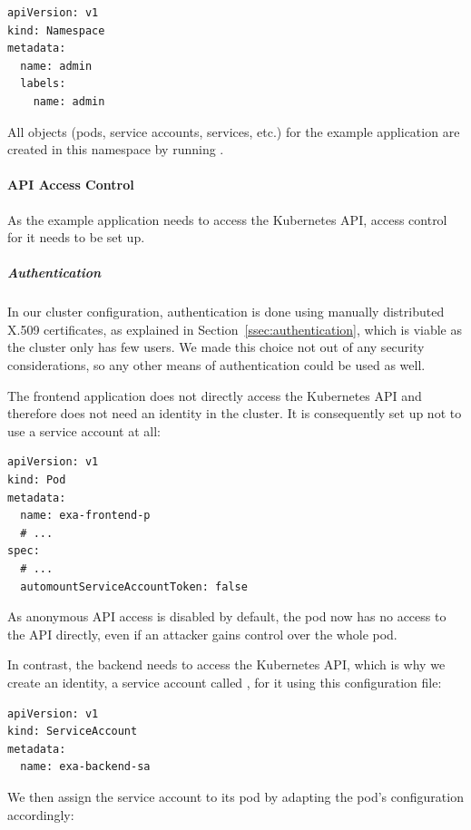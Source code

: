 \begin{verbatim}
apiVersion: v1
kind: Namespace
metadata:
  name: admin
  labels:
    name: admin
\end{verbatim}

All objects (pods, service accounts, services, etc.) for the example application are created in this namespace by running .

\paragraph{API Access Control}

As the example application needs to access the Kubernetes API, access control for it needs to be set up.

\subparagraph{Authentication}
In our cluster configuration, authentication is done using manually distributed X.509 certificates, as explained in Section~\ref{ssec:authentication}, which is viable as the cluster only has few users. We made this choice not out of any security considerations, so any other means of authentication could be used as well. 

The frontend application does not directly access the Kubernetes API and therefore does not need an identity in the cluster. It is consequently set up not to use a service account at all:

\begin{verbatim}
apiVersion: v1
kind: Pod
metadata:
  name: exa-frontend-p
  # ...
spec:
  # ...
  automountServiceAccountToken: false
\end{verbatim}

As anonymous API access is disabled by default, the pod  now has no access to the API directly, even if an attacker gains control over the whole pod.

In contrast, the backend needs to access the Kubernetes API, which is why we create an identity, a service account called , for it using this configuration file:

\begin{verbatim}
apiVersion: v1
kind: ServiceAccount
metadata:
  name: exa-backend-sa
\end{verbatim}

We then assign the service account to its pod by adapting the pod's configuration accordingly:


